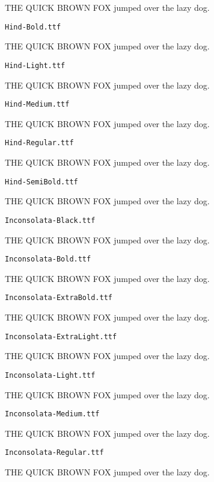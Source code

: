\documentclass{article}
\begin{document}
THE QUICK BROWN FOX jumped over the lazy dog.

\setmainfont[Extension=.ttf]{Hind-Bold}
\noindent \verb!Hind-Bold.ttf!

THE QUICK BROWN FOX jumped over the lazy dog.

\setmainfont[Extension=.ttf]{Hind-Light}
\noindent \verb!Hind-Light.ttf!

THE QUICK BROWN FOX jumped over the lazy dog.

\setmainfont[Extension=.ttf]{Hind-Medium}
\noindent \verb!Hind-Medium.ttf!

THE QUICK BROWN FOX jumped over the lazy dog.

\setmainfont[Extension=.ttf]{Hind-Regular}
\noindent \verb!Hind-Regular.ttf!

THE QUICK BROWN FOX jumped over the lazy dog.

\setmainfont[Extension=.ttf]{Hind-SemiBold}
\noindent \verb!Hind-SemiBold.ttf!

THE QUICK BROWN FOX jumped over the lazy dog.

\setmainfont[Extension=.ttf]{Inconsolata-Black}
\noindent \verb!Inconsolata-Black.ttf!

THE QUICK BROWN FOX jumped over the lazy dog.

\setmainfont[Extension=.ttf]{Inconsolata-Bold}
\noindent \verb!Inconsolata-Bold.ttf!

THE QUICK BROWN FOX jumped over the lazy dog.

\setmainfont[Extension=.ttf]{Inconsolata-ExtraBold}
\noindent \verb!Inconsolata-ExtraBold.ttf!

THE QUICK BROWN FOX jumped over the lazy dog.

\setmainfont[Extension=.ttf]{Inconsolata-ExtraLight}
\noindent \verb!Inconsolata-ExtraLight.ttf!

THE QUICK BROWN FOX jumped over the lazy dog.

\setmainfont[Extension=.ttf]{Inconsolata-Light}
\noindent \verb!Inconsolata-Light.ttf!

THE QUICK BROWN FOX jumped over the lazy dog.

\setmainfont[Extension=.ttf]{Inconsolata-Medium}
\noindent \verb!Inconsolata-Medium.ttf!

THE QUICK BROWN FOX jumped over the lazy dog.

\setmainfont[Extension=.ttf]{Inconsolata-Regular}
\noindent \verb!Inconsolata-Regular.ttf!

THE QUICK BROWN FOX jumped over the lazy dog.
\end{document}
